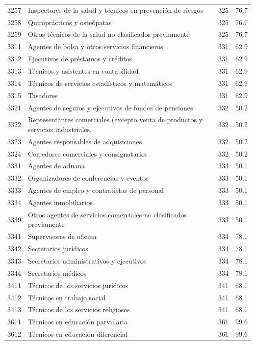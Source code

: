 \begin{longtable}{@{}c p{} c r@{}}
3257 & Inspectores de la salud y técnicos en prevención de riesgos & 325 & 76.7 \\
3258 & Quiroprácticos y osteópatas & 325 & 76.7 \\
3259 & Otros técnicos de la salud no clasificados previamente & 325 & 76.7 \\
3311 & Agentes de bolsa y otros servicios financieros & 331 & 62.9 \\
3312 & Ejecutivos de préstamos y créditos & 331 & 62.9 \\
3313 & Técnicos y asistentes en contabilidad & 331 & 62.9 \\
3314 & Técnicos de servicios estadísticos y matemáticos & 331 & 62.9 \\
3315 & Tasadores & 331 & 62.9 \\
3321 & Agentes de seguros y ejecutivos de fondos de pensiones & 332 & 50.2 \\
3322 & Representantes comerciales (excepto venta de productos y servicios industriales, & 332 & 50.2 \\
3323 & Agentes responsables de adquisiciones & 332 & 50.2 \\
3324 & Corredores comerciales y consignatarios & 332 & 50.2 \\
3331 & Agentes de aduana & 333 & 50.1 \\
3332 & Organizadores de conferencias y eventos & 333 & 50.1 \\
3333 & Agentes de empleo y contratistas de personal & 333 & 50.1 \\
3334 & Agentes inmobiliarios & 333 & 50.1 \\
3339 & Otros agentes de servicios comerciales no clasificados previamente & 333 & 50.1 \\
3341 & Supervisores de oficina & 334 & 78.1 \\
3342 & Secretarios jurídicos & 334 & 78.1 \\
3343 & Secretarios administrativos y ejecutivos & 334 & 78.1 \\
3344 & Secretarios médicos & 334 & 78.1 \\
3411 & Técnicos de los servicios jurídicos & 341 & 68.1 \\
3412 & Técnicos en trabajo social & 341 & 68.1 \\
3413 & Técnicos de los servicios religiosos & 341 & 68.1 \\
3611 & Técnicos en educación parvularia & 361 & 99.6 \\
3612 & Técnicos en educación diferencial & 361 & 99.6 \\

\end{longtable}
